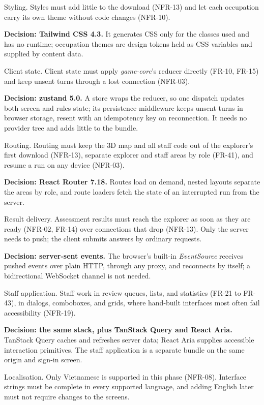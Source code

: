 Styling. Styles must add little to the download (NFR-13) and let each occupation carry its own theme without code changes (NFR-10).

\textbf{Decision: Tailwind CSS 4.3.} It generates CSS only for the classes used and has no runtime\cite{r143}; occupation themes are design tokens held as CSS variables and supplied by content data.

Client state. Client state must apply \textit{game-core}'s reducer directly (FR-10, FR-15) and keep unsent turns through a lost connection (NFR-03).

\textbf{Decision: zustand 5.0.} A store wraps the reducer, so one dispatch updates both screen and rules state; its persistence middleware keeps unsent turns in browser storage, resent with an idempotency key on reconnection\cite{r144}. It needs no provider tree and adds little to the bundle.

Routing. Routing must keep the 3D map and all staff code out of the explorer's first download (NFR-13), separate explorer and staff areas by role (FR-41), and resume a run on any device (NFR-03).

\textbf{Decision: React Router 7.18.} Routes load on demand, nested layouts separate the areas by role, and route loaders fetch the state of an interrupted run from the server\cite{r145}.

Result delivery. Assessment results must reach the explorer as soon as they are ready (NFR-02, FR-14) over connections that drop (NFR-13). Only the server needs to push; the client submits answers by ordinary requests.

\textbf{Decision: server-sent events.} The browser's built-in \textit{EventSource} receives pushed events over plain HTTP, through any proxy, and reconnects by itself\cite{r146}; a bidirectional WebSocket channel is not needed.

Staff application. Staff work in review queues, lists, and statistics (FR-21 to FR-43), in dialogs, comboboxes, and grids, where hand-built interfaces most often fail accessibility (NFR-19).

\textbf{Decision: the same stack, plus TanStack Query and React Aria.} TanStack Query caches and refreshes server data\cite{r147}; React Aria supplies accessible interaction primitives\cite{r148}. The staff application is a separate bundle on the same origin and sign-in screen.

Localisation. Only Vietnamese is supported in this phase (NFR-08). Interface strings must be complete in every supported language, and adding English later must not require changes to the screens.

